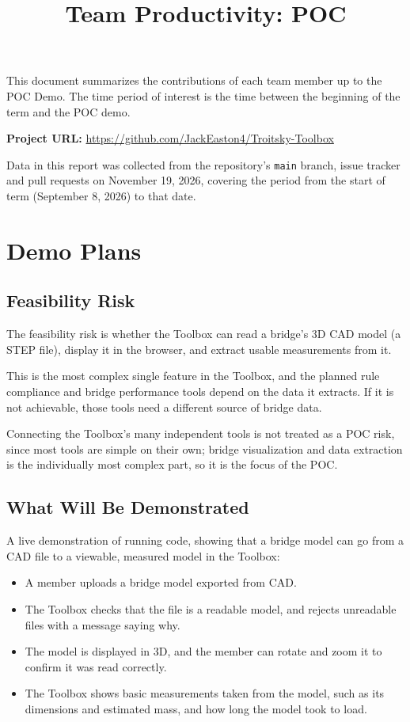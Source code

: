 \documentclass{article}
\title{Team Productivity: POC\\\progname}
\author{\authname}
\date{}
\begin{document}
\maketitle

This document summarizes the contributions of each team member up to the POC
Demo.  The time period of interest is the time between the beginning of the term
and the POC demo.

\noindent \textbf{Project URL: }
\url{https://github.com/JackEaston4/Troitsky-Toolbox}

\noindent Data in this report was collected from the repository's \texttt{main}
branch, issue tracker and pull requests on November 19, 2026, covering the
period from the start of term (September 8, 2026) to that date.

\section{Demo Plans}

\subsection*{Feasibility Risk}

The feasibility risk is whether the Toolbox can read a bridge's 3D CAD model
(a STEP file), display it in the browser, and extract usable measurements from
it.

This is the most complex single feature in the Toolbox, and the planned rule
compliance and bridge performance tools depend on the data it extracts. If it
is not achievable, those tools need a different source of bridge data.

Connecting the Toolbox's many independent tools is not treated as a POC risk,
since most tools are simple on their own; bridge visualization and data
extraction is the individually most complex part, so it is the focus of the
POC.

\subsection*{What Will Be Demonstrated}

A live demonstration of running code, showing that a bridge model can go from a
CAD file to a viewable, measured model in the Toolbox:
\begin{itemize}
\item A member uploads a bridge model exported from CAD.
\item The Toolbox checks that the file is a readable model, and rejects
  unreadable files with a message saying why.
\item The model is displayed in 3D, and the member can rotate and zoom it to
  confirm it was read correctly.
\item The Toolbox shows basic measurements taken from the model, such as its
  dimensions and estimated mass, and how long the model took to load.
\end{itemize}
\end{document}
